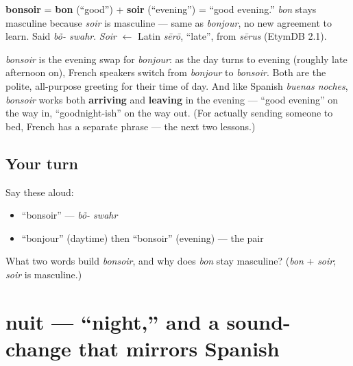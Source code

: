 \begin{cousinweb}
\textbf{bonsoir} = \textbf{bon} (\textquotedblleft{}good\textquotedblright{}) + \textbf{soir} (\textquotedblleft{}evening\textquotedblright{}) = \textquotedblleft{}good evening.\textquotedblright{} \emph{bon} stays masculine because \emph{soir} is masculine — same as \emph{bonjour}, no new agreement to learn. Said \emph{bõ- swahr}. \emph{Soir} $\leftarrow$ Latin \emph{sērō}, \textquotedblleft{}late\textquotedblright{}, from \emph{sērus} (EtymDB 2.1).
\end{cousinweb}

\begin{culture}
\emph{bonsoir} is the evening swap for \emph{bonjour}: as the day turns to evening (roughly late afternoon on), French speakers switch from \emph{bonjour} to \emph{bonsoir}. Both are the polite, all-purpose greeting for their time of day. And like Spanish \emph{buenas noches}, \emph{bonsoir} works both \textbf{arriving} and \textbf{leaving} in the evening — \textquotedblleft{}good evening\textquotedblright{} on the way in, \textquotedblleft{}goodnight-ish\textquotedblright{} on the way out. (For actually sending someone to bed, French has a separate phrase — the next two lessons.)
\end{culture}

\subsection*{Your turn}
Say these aloud:

\begin{itemize}
\raggedright
  \item \textquotedblleft{}bonsoir\textquotedblright{} — \emph{bõ- swahr}
  \item \textquotedblleft{}bonjour\textquotedblright{} (daytime) then \textquotedblleft{}bonsoir\textquotedblright{} (evening) — the pair
\end{itemize}

\begin{tcolorbox}[breakable,colback=teal!4,colframe=teal!35!black,title={Before you move on}]
What two words build \emph{bonsoir}, and why does \emph{bon} stay masculine? (\emph{bon} + \emph{soir}; \emph{soir} is masculine.)
\end{tcolorbox}
\section[nuit]{nuit — \textquotedblleft{}night,\textquotedblright{} and a sound-change that mirrors Spanish}

